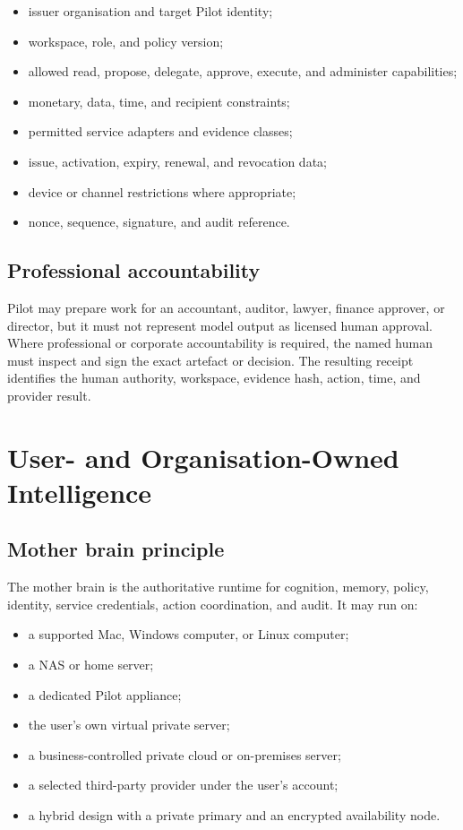 \documentclass[11pt,a4paper]{article}
\begin{document}
\begin{itemize}[leftmargin=*]
  \item issuer organisation and target Pilot identity;
  \item workspace, role, and policy version;
  \item allowed read, propose, delegate, approve, execute, and administer capabilities;
  \item monetary, data, time, and recipient constraints;
  \item permitted service adapters and evidence classes;
  \item issue, activation, expiry, renewal, and revocation data;
  \item device or channel restrictions where appropriate;
  \item nonce, sequence, signature, and audit reference.
\end{itemize}

\subsection{Professional accountability}

Pilot may prepare work for an accountant, auditor, lawyer, finance approver, or
director, but it must not represent model output as licensed human approval.
Where professional or corporate accountability is required, the named human
must inspect and sign the exact artefact or decision.  The resulting receipt
identifies the human authority, workspace, evidence hash, action, time, and
provider result.

\section{User- and Organisation-Owned Intelligence}

\subsection{Mother brain principle}

The mother brain is the authoritative runtime for cognition, memory, policy,
identity, service credentials, action coordination, and audit.  It may run on:

\begin{itemize}[leftmargin=*]
  \item a supported Mac, Windows computer, or Linux computer;
  \item a NAS or home server;
  \item a dedicated Pilot appliance;
  \item the user's own virtual private server;
  \item a business-controlled private cloud or on-premises server;
  \item a selected third-party provider under the user's account;
  \item a hybrid design with a private primary and an encrypted availability node.
\end{itemize}
\end{document}

